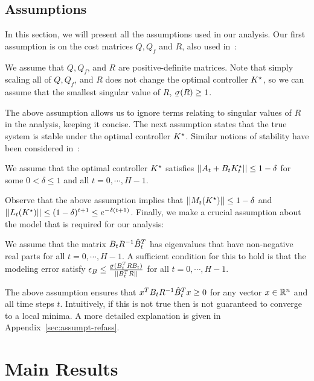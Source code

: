 \subsection{Assumptions}
\label{sec:assumptions}
In this section, we will present all the assumptions used in our analysis.
Our first assumption is on the cost matrices $Q, Q_f$ and $R$, also used in~\cite{mania19}:
\begin{assumption}
  We assume that $Q, Q_f$, and $R$ are positive-definite matrices. Note that simply
  scaling all of $Q, Q_f$, and $R$ does not change the optimal controller $K^\star$, so we can
  assume that the smallest singular value of $R$, $\ubar{\sigma}(R) \geq 1$.
  \label{assumption:singularvalue}
\end{assumption}
The above assumption allows us to ignore terms relating to singular
values of $R$ in the analysis, keeping it concise. The
next assumption states that the true system is stable under the
optimal controller $K^\star$. Similar notions of stability have been considered in~\cite{cohen18}:
\begin{assumption}
  We assume that the optimal controller $K^\star$ satisfies
  $||A_{t} + B_{t}K^\star_{t}|| \leq 1 - \delta$ for some
  $0 < \delta \leq 1$ and all $t=0, \cdots, H-1$.
  \label{assumption:stability}
\end{assumption}
Observe that the above assumption implies that $||M_{t}(K^\star)|| \leq 1 - \delta$
and $||L_{t}(K^\star)|| \leq (1 - \delta)^{t+1} \leq e^{{-\delta(t+1)}}$.
Finally, we make a crucial assumption about the model that
is required for our \ILC{} analysis:
\begin{assumption}
  We assume that the matrix $B_{t}R^{-1}\hat{B}_{t}^{T}$ has eigenvalues that have
  non-negative real parts for all $t=0, \cdots, H-1$. A sufficient condition for
  this to hold is that the
  modeling error satisfy
  $\epsB \leq \frac{\ubar{\sigma}(B_{t}^{T}RB_{t})}{||B_{t}^{T}R||}$
  for all $t=0, \cdots, H-1$.
  \label{assumption:psd}
\end{assumption}
The above assumption ensures that $x^{T}B_{t}R^{-1}\hat{B}_{t}^{T}x \geq 0$ for any vector
$x \in \mathbb{R}^{n}$ and all time steps $t$. Intuitively, if this is not true then \ILC{} is not
guaranteed to converge to a local minima. A more detailed
explanation is given in Appendix~\ref{sec:assumpt-refass}.

\section{Main Results}
\label{sec:main-results}

